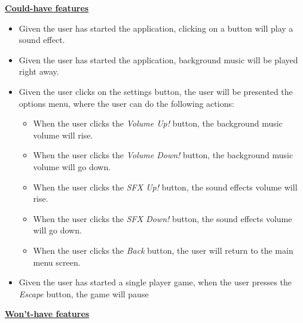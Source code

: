 \documentclass[a4paper,11pt]{article}
\begin{document}
\noindent
\textbf{\underline{Could-have features}}
\begin{itemize}
  \item Given the user has started the application, clicking on a button will play a sound effect.
  \item Given the user has started the application, background music will be played right away.
  \item Given the user clicks on the settings button, the user will be presented the options menu, where the user can do the following actions:
  \begin{itemize}
    \item When the user clicks the \textit{Volume Up!} button, the background music volume will rise.
    \item When the user clicks the \textit{Volume Down!} button, the background music volume will go down.
    \item When the user clicks the \textit{SFX Up!} button, the sound effects volume will rise.
    \item When the user clicks the \textit{SFX Down!} button, the sound effects volume will go down.
    \item When the user clicks the \textit{Back} button, the user will return to the main menu screen.
  \end{itemize}
  \item Given the user has started a single player game, when the user presses the \textit{Escape} button, the game will pause
\end{itemize}

\newpage
\noindent
\textbf{\underline{Won't-have features}}
\end{document}

